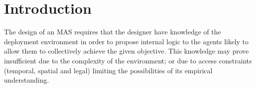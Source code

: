 \documentclass{ecai}
\begin{document}

\section{Introduction}





%


The design of an MAS requires that the designer have knowledge of the deployment environment in order to propose internal logic to the agents likely to allow them to collectively achieve the given objective.
%
This knowledge may prove insufficient due to the complexity of the environment; or due to access constraints (temporal, spatial and legal) limiting the possibilities of its empirical understanding.
\end{document}
